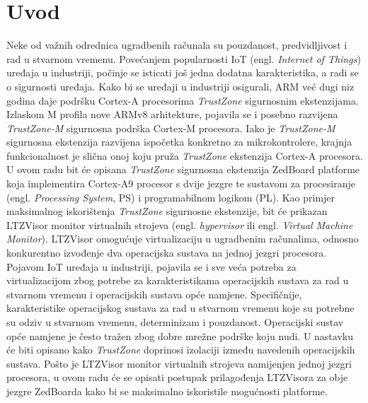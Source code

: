 \documentclass[times, utf8, diplomski, numeric]{fer}
\begin{document}
\chapter{Uvod}
Neke od važnih odrednica ugradbenih računala su pouzdanost, predvidljivost i rad u stvarnom vremenu.
Povećanjem popularnosti IoT (engl. \textit{Internet of Things}) uređaja u industriji, počinje se isticati
još jedna dodatna karakteristika, a radi se o sigurnosti uređaja. Kako bi se uređaji u industriji osigurali,
ARM već dugi niz godina daje podršku Cortex-A procesorima \textit{TrustZone} sigurnosnim ekstenzijama.
Izlaskom M profila nove ARMv8 arhitekture, pojavila se i posebno razvijena \textit{TrustZone-M} sigurnosna
podrška Cortex-M procesora. Iako je \textit{TrustZone-M} sigurnosna ekstenzija razvijena ispočetka konkretno
za mikrokontrolere, krajnja funkcionalnost je slična onoj koju pruža \textit{TrustZone} ekstenzija Cortex-A
procesora.\\
U ovom radu bit će opisana \textit{TrustZone} sigurnosna ekstenzija ZedBoard platforme koja implementira
Cortex-A9 procesor s dvije jezgre te sustavom za procesiranje (engl. \textit{Processing System}, PS) i programabilnom
logikom (PL). Kao primjer maksimalnog iskorištenja \textit{TrustZone} sigurnosne
ekstenzije, bit će prikazan LTZVisor monitor virtualnih strojeva (engl. \textit{hypervisor} ili engl.
\textit{Virtual Machine Monitor}). LTZVisor omogućuje virtualizaciju u ugradbenim računalima, odnosno konkurentno
izvođenje dva operacijska sustava na jednoj jezgri procesora. Pojavom IoT uređaja u industriji, pojavila
se i sve veća potreba za virtualizacijom zbog potrebe za karakteristikama operacijskih sustava za rad u stvarnom
vremenu i operacijskih sustava opće namjene. Specifičnije, karakteristike operacijskog sustava za rad u
stvarnom vremenu koje su potrebne su odziv u stvarnom vremenu, determinizam i pouzdanost. Operacijski
sustav opće namjene je često tražen zbog dobre mrežne podrške koju nudi. U nastavku će biti opisano kako
\textit{TrustZone} doprinosi izolaciji između navedenih operacijskih sustava. Pošto je LTZVisor monitor
virtualnih strojeva namijenjen jednoj jezgri procesora, u ovom radu će se opisati postupak prilagođenja
LTZVisora za obje jezgre ZedBoarda kako bi se maksimalno iskoristile mogućnosti platforme.
\end{document}
